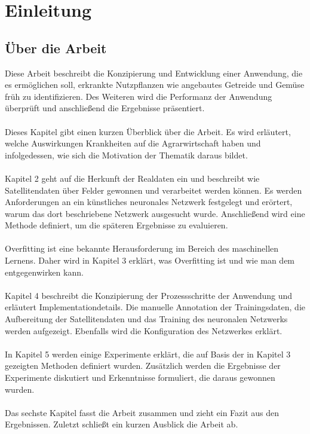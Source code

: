 \chapter{Einleitung}\label{chap:introduction}

\section{Über die Arbeit}

Diese Arbeit beschreibt die Konzipierung und Entwicklung einer Anwendung, die es ermöglichen soll, erkrankte Nutzpflanzen wie angebautes Getreide und Gemüse früh zu identifizieren. Des Weiteren wird die Performanz der Anwendung überprüft und anschließend die Ergebnisse präsentiert.
\\\\
Dieses Kapitel gibt einen kurzen Überblick über die Arbeit. Es wird erläutert, welche Auswirkungen Krankheiten auf die Agrarwirtschaft haben und infolgedessen, wie sich die Motivation der Thematik daraus bildet.
\\\\
Kapitel 2 geht auf die Herkunft der Realdaten ein und beschreibt wie Satellitendaten über Felder gewonnen und verarbeitet werden können. Es werden Anforderungen an ein künstliches neuronales Netzwerk festgelegt und erörtert, warum das dort beschriebene Netzwerk ausgesucht wurde. Anschließend wird eine Methode definiert, um die späteren Ergebnisse zu evaluieren.
\\\\
Overfitting ist eine bekannte Herausforderung im Bereich des maschinellen Lernens. Daher wird in Kapitel 3 erklärt, was Overfitting ist und wie man dem entgegenwirken kann.
\\\\
Kapitel 4 beschreibt die Konzipierung der Prozessschritte der Anwendung und erläutert Implementationdetails. Die manuelle Annotation der Trainingsdaten, die Aufbereitung der Satellitendaten und das Training des neuronalen Netzwerks werden aufgezeigt. Ebenfalls wird die Konfiguration des Netzwerkes erklärt.
\\\\
In Kapitel 5 werden einige Experimente erklärt, die auf Basis der in Kapitel 3 gezeigten Methoden definiert wurden. Zusätzlich werden die Ergebnisse der Experimente diskutiert und Erkenntnisse formuliert, die daraus gewonnen wurden.
\\\\
Das sechste Kapitel fasst die Arbeit zusammen und zieht ein Fazit aus den Ergebnissen. Zuletzt schließt ein kurzen Ausblick die Arbeit ab.

